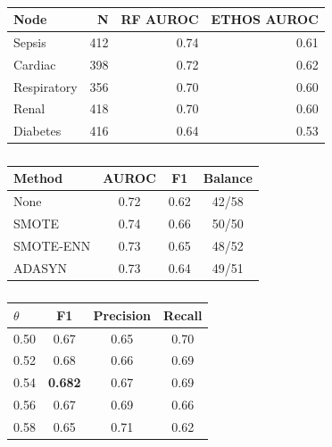 \begin{table}[h]
\begin{englishblock}
\centering
\caption{}
\begin{tabular}{lrrr}
\toprule
Node & N & RF AUROC & ETHOS AUROC \\
\midrule
Sepsis & 412 & 0.74 & 0.61 \\
Cardiac & 398 & 0.72 & 0.62 \\
Respiratory & 356 & 0.70 & 0.60 \\
Renal & 418 & 0.70 & 0.60 \\
Diabetes & 416 & 0.64 & 0.53 \\
\bottomrule
\end{tabular}
\label{tab:node_baselines}
\end{englishblock}
\end{table}

\begin{table}[h]
\begin{englishblock}
\centering
\caption{}
\begin{tabular}{lccc}
\toprule
Method & AUROC & F1 & Balance \\
\midrule
None & 0.72 & 0.62 & 42/58 \\
SMOTE & 0.74 & 0.66 & 50/50 \\
SMOTE-ENN & 0.73 & 0.65 & 48/52 \\
ADASYN & 0.73 & 0.64 & 49/51 \\
\bottomrule
\end{tabular}
\label{tab:smote}
\end{englishblock}
\end{table}

\begin{table}[h]
\begin{englishblock}
\centering
\caption{}
\begin{tabular}{lccc}
\toprule
$\theta$ & F1 & Precision & Recall \\
\midrule
0.50 & 0.67 & 0.65 & 0.70 \\
0.52 & 0.68 & 0.66 & 0.69 \\
0.54 & \textbf{0.682} & 0.67 & 0.69 \\
0.56 & 0.67 & 0.69 & 0.66 \\
0.58 & 0.65 & 0.71 & 0.62 \\
\bottomrule
\end{tabular}
\label{tab:threshold}
\end{englishblock}
\end{table}

